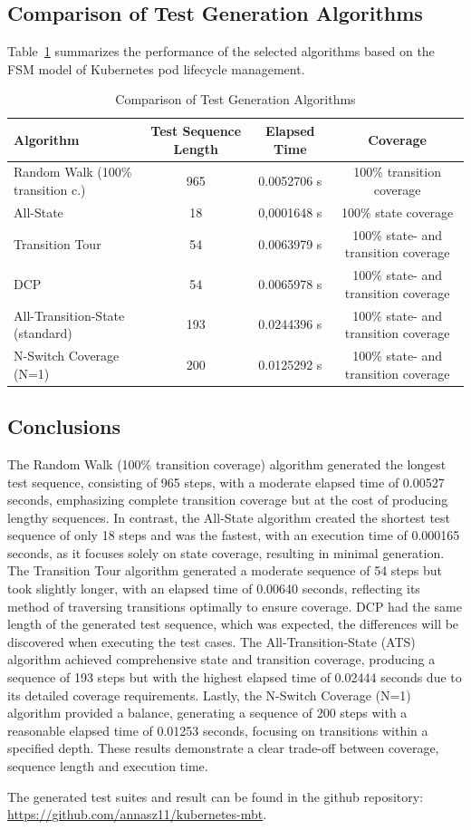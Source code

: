 \documentclass[main.tex]{subfiles}
\begin{document}
\subsection{Comparison of Test Generation Algorithms}

Table~\ref{tab:algorithm_comparison} summarizes the performance of the selected algorithms based on the FSM model of Kubernetes pod lifecycle management.

\begin{table}[H]
\centering
\caption{Comparison of Test Generation Algorithms}
\label{tab:algorithm_comparison}
\begin{tabular}{|l|c|c|c|}
\hline
\textbf{Algorithm}     & \textbf{Test Sequence Length}     & \textbf{Elapsed Time}      & \textbf{Coverage} \\ \hline
Random Walk (100\% transition c.)     & 965     & 0.0052706 s    & 100\% transition coverage  \\ \hline
All-State     & 18     & 0,0001648 s    & 100\% state coverage \\ \hline
Transition Tour     & 54     & 0.0063979 s  & 100\% state- and transition coverage    \\ \hline
DCP     & 54     &  0.0065978 s  & 100\% state- and transition coverage    \\ \hline
All-Transition-State (standard)     & 193     & 0.0244396 s     & 100\% state- and transition coverage    \\ \hline
N-Switch Coverage (N=1)     & 200     & 0.0125292 s     & 100\% state- and transition coverage    \\ \hline
\end{tabular}
\end{table}

\subsection{Conclusions}
The Random Walk (100\% transition coverage) algorithm generated the longest test sequence, consisting of 965 steps, with a moderate elapsed time of 0.00527 seconds, emphasizing complete transition coverage but at the cost of producing lengthy sequences. In contrast, the All-State algorithm created the shortest test sequence of only 18 steps and was the fastest, with an execution time of 0.000165 seconds, as it focuses solely on state coverage, resulting in minimal generation. The Transition Tour algorithm generated a moderate sequence of 54 steps but took slightly longer, with an elapsed time of 0.00640 seconds, reflecting its method of traversing transitions optimally to ensure coverage. DCP had the same length of the generated test sequence, which was expected, the differences will be discovered when executing the test cases. The All-Transition-State (ATS) algorithm achieved comprehensive state and transition coverage, producing a sequence of 193 steps but with the highest elapsed time of 0.02444 seconds due to its detailed coverage requirements. Lastly, the N-Switch Coverage (N=1) algorithm provided a balance, generating a sequence of 200 steps with a reasonable elapsed time of 0.01253 seconds, focusing on transitions within a specified depth. These results demonstrate a clear trade-off between coverage, sequence length and execution time.


The generated test suites and result can be found in the github repository: \url{https://github.com/annasz11/kubernetes-mbt}.
\end{document}
